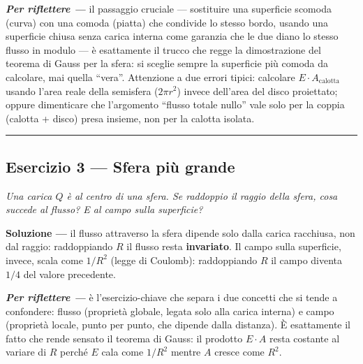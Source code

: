 \documentclass[11pt,a4paper]{scrartcl}
\newenvironment{soluzione}{\par\noindent\textbf{Soluzione ---} }{\par}
\newenvironment{riflessione}{\par\noindent\textit{\textbf{Per riflettere ---} }}{\par}
\begin{document}
\begin{riflessione}
il passaggio cruciale --- sostituire una superficie scomoda (curva) con una comoda (piatta) che
condivide lo stesso bordo, usando una superficie chiusa senza carica interna come garanzia che le
due diano lo stesso flusso in modulo --- è esattamente il trucco che regge la dimostrazione del
teorema di Gauss per la sfera: si sceglie sempre la superficie più comoda da calcolare, mai quella
``vera''. Attenzione a due errori tipici: calcolare $E\cdot A_{\text{calotta}}$ usando l'area reale
della semisfera ($2\pi r^2$) invece dell'area del disco proiettato; oppure dimenticare che
l'argomento ``flusso totale nullo'' vale solo per la coppia (calotta + disco) presa insieme, non
per la calotta isolata.
\end{riflessione}

\bigskip\hrule\bigskip

\subsection*{Esercizio 3 --- Sfera più grande}

\begin{esercizio}
\emph{Una carica $Q$ è al centro di una sfera. Se raddoppio il raggio della sfera, cosa succede al
flusso? E al campo sulla superficie?}
\end{esercizio}

\begin{center}
\end{center}

\begin{soluzione}
il flusso attraverso la sfera dipende solo dalla carica racchiusa, non dal raggio: raddoppiando $R$
il flusso resta \textbf{invariato}. Il campo sulla superficie, invece, scala come $1/R^2$ (legge di
Coulomb): raddoppiando $R$ il campo diventa $1/4$ del valore precedente.
\end{soluzione}

\begin{riflessione}
è l'esercizio-chiave che separa i due concetti che si tende a confondere: flusso (proprietà
globale, legata solo alla carica interna) e campo (proprietà locale, punto per punto, che dipende
dalla distanza). È esattamente il fatto che rende sensato il teorema di Gauss: il prodotto $E\cdot A$
resta costante al variare di $R$ perché $E$ cala come $1/R^2$ mentre $A$ cresce come $R^2$.
\end{riflessione}
\end{document}
